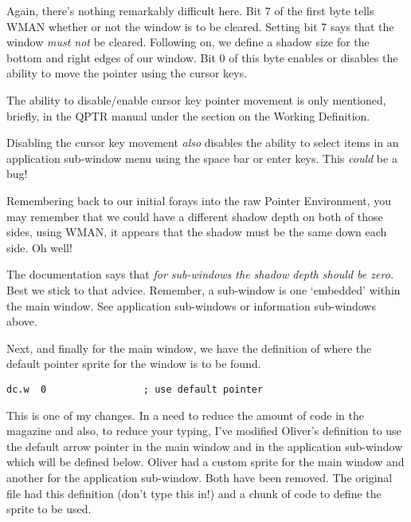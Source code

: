 Again, there's nothing remarkably difficult here. Bit 7 of the first
    byte tells WMAN whether or not the window is to be cleared. Setting bit 7
    says that the window \emph{must not} be cleared. Following
    on, we define a shadow size for the bottom and right edges of our window.
    Bit 0 of this byte enables or disables the ability to move the pointer
    using the cursor keys.

\begin{note}
The ability to disable/enable cursor key pointer movement is only
      mentioned, briefly, in the QPTR manual under the section on the Working
      Definition.

Disabling the cursor key movement \emph{also}       disables the ability to select items in an application sub-{}window menu
      using the space bar or enter keys. This \emph{could} be a
      bug!
\end{note}

Remembering back to our initial forays into the raw Pointer
    Environment, you may remember that we could have a different shadow depth
    on both of those sides, using WMAN, it appears that the shadow must be the
    same down each side. Oh well!

\begin{note}
The documentation says that \emph{for sub-{}windows the shadow
      depth should be zero.} Best we stick to that advice. Remember,
      a sub-{}window is one `embedded' within the main window. See application
      sub-{}windows or information sub-{}windows above.
\end{note}

Next, and finally for the main window, we have the definition of
    where the default pointer sprite for the window is to be found.

\begin{lstlisting}[firstnumber=last,caption={Main Window - Default Pointer}]
           dc.w  0                 ; use default pointer
\end{lstlisting}

This is one of my changes. In a need to reduce the amount of code in
    the magazine and also, to reduce your typing, I've modified Oliver's
    definition to use the default arrow pointer in the main window and in the
    application sub-{}window which will be defined below. Oliver had a custom
    sprite for the main window and another for the application sub-{}window.
    Both have been removed. The original file had this definition (don't type
    this in!) and a chunk of code to define the sprite to be used.

